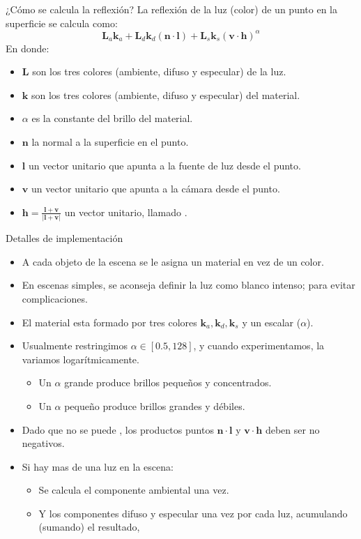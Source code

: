 \begin{frame}{¿Cómo se calcula la reflexión?}
La reflexión de la luz (color) de un punto en la superficie se calcula como:
 $$\mathbf{L}_a \mathbf{k}_a + \mathbf{L}_d \mathbf{k}_d (\mathbf{n} \cdot \mathbf{l}) + \mathbf{L}_s \mathbf{k}_s (\mathbf{v} \cdot \mathbf{h})^{\alpha}$$
 En donde:
 \begin{itemize}
  \item $\mathbf{L}$ son los tres colores (ambiente, difuso y especular) de la luz.
  \item $\mathbf{k}$ son los tres colores (ambiente, difuso y especular) del material.
  \item $\alpha$ es la constante del brillo del material.
  \item $\mathbf{n}$ la normal a la superficie en el punto.
  \item $\mathbf{l}$ un vector unitario que apunta a la fuente de luz desde el punto.
  \item $\mathbf{v}$ un vector unitario que apunta a la cámara desde el punto.
  \item $\mathbf{h} = \frac{\mathbf{l} + \mathbf{v}}{|\mathbf{l} + \mathbf{v}|}$ un vector unitario, llamado .
 \end{itemize}
\end{frame}


\begin{frame}{Detalles de implementación}
\begin{itemize}
  \item A cada objeto de la escena se le asigna un material en vez de un color.
  \item En escenas simples, se aconseja definir la luz como blanco intenso; para evitar complicaciones.
   \item El material esta formado por tres colores $\mathbf{k}_a, \mathbf{k}_d, \mathbf{k}_s$ y un escalar ($\alpha$).
   \item Usualmente restringimos $\alpha \in [ 0.5, 128 ]$, y cuando experimentamos, la variamos logarítmicamente.
  \begin{itemize}
   \item Un $\alpha$ grande produce brillos pequeños y concentrados.
   \item Un $\alpha$ pequeño produce brillos grandes y débiles.
  \end{itemize}
  \item Dado que no se puede , los productos puntos $\mathbf{n} \cdot \mathbf{l}$ y $\mathbf{v} \cdot \mathbf{h}$ deben ser no negativos.
  \item Si hay mas de una luz en la escena:
  \begin{itemize}
   \item Se calcula el componente ambiental una vez.
   \item Y los componentes difuso y especular una vez por cada luz, acumulando (sumando) el resultado,
  \end{itemize}
\end{itemize}
\end{frame}

